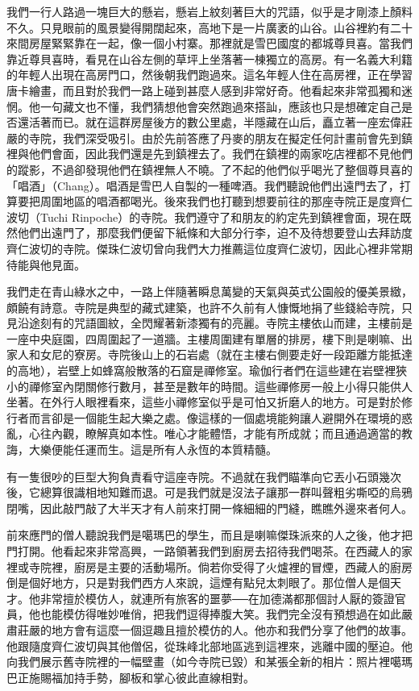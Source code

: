 我們一行人路過一塊巨大的懸岩，懸岩上紋刻著巨大的咒語，似乎是才剛漆上顏料不久。只見眼前的風景變得開闊起來，高地下是一片廣袤的山谷。山谷裡約有二十來間房屋緊緊靠在一起，像一個小村寨。那裡就是雪巴國度的都城尊貝喜。當我們靠近尊貝喜時，看見在山谷左側的草坪上坐落著一棟獨立的高房。有一名義大利籍的年輕人出現在高房門口，然後朝我們跑過來。這名年輕人住在高房裡，正在學習唐卡繪畫，而且對於我們一路上碰到甚麼人感到非常好奇。他看起來非常孤獨和迷惘。他一句藏文也不懂，我們猜想他會突然跑過來搭訕，應該也只是想確定自己是否還活著而已。就在這群房屋後方的數公里處，半隱藏在山后，矗立著一座宏偉莊嚴的寺院，我們深受吸引。由於先前答應了丹麥的朋友在擬定任何計畫前會先到鎮裡與他們會面，因此我們還是先到鎮裡去了。我們在鎮裡的兩家吃店裡都不見他們的蹤影，不過卻發現他們在鎮裡無人不曉。了不起的他們似乎喝光了整個尊貝喜的「唱酒」（Chang）。唱酒是雪巴人自製的一種啤酒。我們聽說他們出遠門去了，打算要把周圍地區的唱酒都喝光。後來我們也打聽到想要前往的那座寺院正是度齊仁波切（Tuchi
Rinpoche）的寺院。我們遵守了和朋友的約定先到鎮裡會面，現在既然他們出遠門了，那麼我們便留下紙條和大部分行李，迫不及待想要登山去拜訪度齊仁波切的寺院。傑珠仁波切曾向我們大力推薦這位度齊仁波切，因此心裡非常期待能與他見面。

我們走在青山綠水之中，一路上伴隨著瞬息萬變的天氣與英式公園般的優美景緻，頗饒有詩意。寺院是典型的藏式建築，也許不久前有人慷慨地捐了些錢給寺院，只見沿途刻有的咒語圖紋，全閃耀著新漆獨有的亮麗。寺院主樓依山而建，主樓前是一座中央庭園，四周圍起了一道牆。主樓周圍建有單層的排房，樓下則是喇嘛、出家人和女尼的寮房。寺院後山上的石岩處（就在主樓右側要走好一段距離方能抵達的高地），岩壁上如蜂窩般散落的石窟是禪修室。瑜伽行者們在這些建在岩壁裡狹小的禪修室內閉關修行數月，甚至是數年的時間。這些禪修房一般上小得只能供人坐著。在外行人眼裡看來，這些小禪修室似乎是可怕又折磨人的地方。可是對於修行者而言卻是一個能生起大樂之處。像這樣的一個處境能夠讓人避開外在環境的惑亂，心往內觀，瞭解真如本性。唯心才能體悟，才能有所成就；而且通過適當的教誨，大樂便能任運而生。這是所有人永恆的本質精髓。

有一隻很吵的巨型大狗負責看守這座寺院。不過就在我們瞄準向它丟小石頭幾次後，它總算很識相地知難而退。可是我們就是沒法子讓那一群叫聲粗劣嘶啞的烏鴉閉嘴，因此敲門敲了大半天才有人前來打開一條細細的門縫，瞧瞧外邊來者何人。

前來應門的僧人聽說我們是噶瑪巴的學生，而且是喇嘛傑珠派來的人之後，他才把門打開。他看起來非常高興，一路領著我們到廚房去招待我們喝茶。在西藏人的家裡或寺院裡，廚房是主要的活動場所。倘若你受得了火爐裡的冒煙，西藏人的廚房倒是個好地方，只是對我們西方人來說，這煙有點兒太刺眼了。那位僧人是個天才。他非常擅於模仿人，就連所有旅客的噩夢──在加德滿都那個討人厭的簽證官員，他也能模仿得唯妙唯俏，把我們逗得捧腹大笑。我們完全沒有預想過在如此嚴肅莊嚴的地方會有這麼一個逗趣且擅於模仿的人。他亦和我們分享了他們的故事。他跟隨度齊仁波切與其他僧侶，從珠峰北部地區逃到這裡來，逃離中國的壓迫。他向我們展示舊寺院裡的一幅壁畫（如今寺院已毀）和某張全新的相片：照片裡噶瑪巴正施賜福加持手勢，腳板和掌心彼此直線相對。


